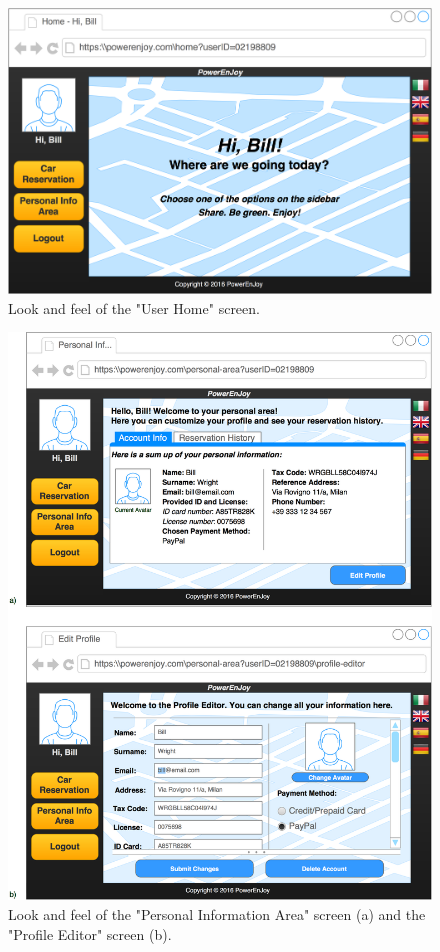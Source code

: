 \begin{figure}[H]
\centering
		\includegraphics[width=\textwidth]{./user_interface_design/diagrams/web_user_home.png}
		\caption{Look and feel of the "User Home" screen.}
		\label{web_user_home}
\end{figure}

\begin{figure}[H]
\centering
		\includegraphics[width=\textwidth]{./user_interface_design/diagrams/web_personal_info_editor.png}
		\caption{Look and feel of the "Personal Information Area" screen (a) and the "Profile Editor" screen (b).}
		\label{web_personal_info_editor}
\end{figure}

